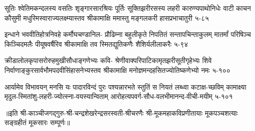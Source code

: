 \annofourlineindentedshloka
{सूतिः श्वेतिमकन्दलस्य वसतिः शृङ्गारसारश्रियः}
{पूर्तिः सूक्तिझरीरसस्य लहरी कारुण्यपाथोनिधेः}
{वाटी काचन कौसुमी मधुरिमस्वाराज्यलक्ष्म्यास्तव}
{श्रीकामाक्षि ममास्तु मङ्गलकरी हासप्रभाचातुरी}
{५-८५}

\annofourlineindentedshloka
{इन्धाने भववीतिहोत्रनिवहे कर्मौघचण्डानिल-}
{प्रौढिम्ना बहुलीकृते निपतितं सन्तापचिन्ताकुलम्}
{मातर्मां परिषिञ्च किञ्चिदमलैः पीयूषवर्षैरिव}
{श्रीकामाक्षि तव स्मितद्युतिकणैः शैशिर्यलीलाकरैः}
{५-९४}

\annofourlineindentedshloka
{क्रीडालोलकृपासरोरुहमुखीसौधाङ्गणेभ्यः कवि-}
{श्रेणीवाक्परिपाटिकामृतझरीसूतीगृहेभ्यः शिवे}
{निर्वाणाङ्कुरसार्वभौमपदवीसिंहासनेभ्यस्तव}
{श्रीकामाक्षि मनोज्ञमन्दहसितज्योतिष्कणेभ्यो नमः}
{५-१००}

\annofourlineindentedshloka
{आर्यामेव विभावयन् मनसि यः पादारविन्दं पुरः}
{पश्यन्नारभते स्तुतिं स नियतं लब्ध्वा कटाक्ष-च्छविम्}
{कामाक्ष्या मृदुल-स्मितांशु-लहरी-ज्योत्स्ना-वयस्यान्विताम्}
{आरोहत्यपवर्ग-सौध-वलभीमानन्द-वीची-मयीम्}
{५-१०१}

॥इति श्री-काञ्चीजगद्गुरु-श्री-चन्द्रशेखरेन्द्रसरस्वती-श्रीचरणैः श्री-मूकमहाकविप्रणीतायाः मूकपञ्चशत्याः सङ्ग्रहीतं मूकसारः सम्पूर्णः॥

\hyperref[sec:start]{\closesection}

\setlength{\shlokaspaceskip}{24pt}
\endgroup